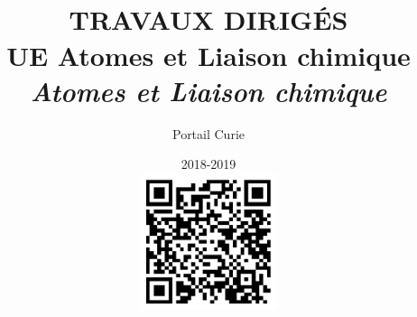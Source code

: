 \documentclass[12pt,french,dvips]{report}
\title{{\Huge \textbf{      \\ 
TRAVAUX DIRIG\'ES  \\[1.5cm] 
UE Atomes et Liaison chimique\\
\textsl{Atomes et Liaison chimique}}}\\[3cm]
\vspace{2cm}}
\author{Portail Curie}
\date{2018-2019\\\includegraphics[height=4cm]{figure/QRcode_fichier_TD.eps}}
\begin{document}

\newcommand{\secd}{\alpha - \varepsilon_i}
\newcommand{\bulletd}{\small \begin{tabular}{c} $\bullet$ \\[-0.3cm] $\bullet$ \\ \end{tabular}}

\newcommand{\bra}{\left\langle}
\newcommand{\ket}{\right\rangle}

\pagestyle{empty}
\maketitle

\cleardoublepage


\pagestyle{plain}
\tableofcontents

\cleardoublepage




%
%
%





\cleardoublepage

\pagestyle{empty}



%
%
\end{document}
